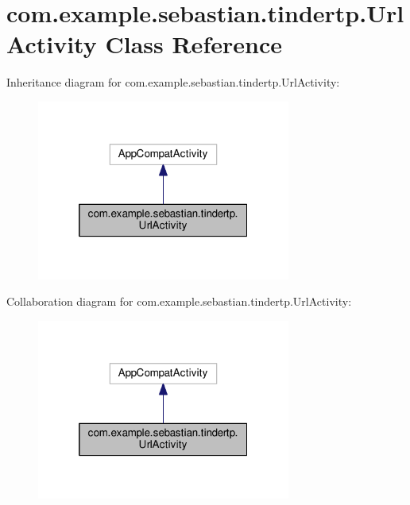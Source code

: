 \hypertarget{classcom_1_1example_1_1sebastian_1_1tindertp_1_1UrlActivity}{}\section{com.\+example.\+sebastian.\+tindertp.\+Url\+Activity Class Reference}
\label{classcom_1_1example_1_1sebastian_1_1tindertp_1_1UrlActivity}


Inheritance diagram for com.\+example.\+sebastian.\+tindertp.\+Url\+Activity\+:\nopagebreak
\begin{figure}[H]
\begin{center}
\leavevmode
\includegraphics[width=236pt]{classcom_1_1example_1_1sebastian_1_1tindertp_1_1UrlActivity__inherit__graph}
\end{center}
\end{figure}


Collaboration diagram for com.\+example.\+sebastian.\+tindertp.\+Url\+Activity\+:\nopagebreak
\begin{figure}[H]
\begin{center}
\leavevmode
\includegraphics[width=236pt]{classcom_1_1example_1_1sebastian_1_1tindertp_1_1UrlActivity__coll__graph}
\end{center}
\end{figure}
